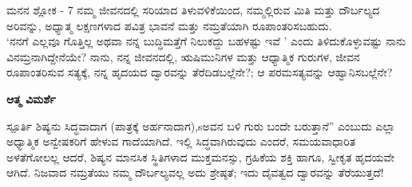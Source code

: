 \begin{mananam}{\mananamfont ಮನನ ಶ್ಲೋಕ - \textenglish{7}}
\footnotesize \mananamtext ನಮ್ಮ ಜೀವನದಲ್ಲಿ ಸರಿಯಾದ ತಿಳುವಳಿಕೆಯಿಂದ, ನಮ್ಮಲ್ಲಿರುವ ಮಿತಿ ಮತ್ತು  ದೌರ್ಬಲ್ಯದ  ಅರಿವನ್ನು, ಅಧ್ಯಾತ್ಮ ಲಕ್ಷಣಗಳಾದ ಪವಿತ್ರ ಭಾವನೆ ಮತ್ತು ನಮ್ರತೆಯಾಗಿ ರೂಪಾಂತರಿಸಬಹುದು. \\
‘ನನಗೆ ಎಲ್ಲವೂ ಗೊತ್ತಿಲ್ಲ ಅಥವಾ ನನ್ನ ಬುದ್ಧಿಮತ್ತೆಗೆ ನಿಲುಕದ್ದು ಬಹಳಷ್ಟು ಇವೆ ’ ಎಂದು ತಿಳಿದುಕೊಳ್ಳುವಷ್ಟು ನಾನು ವಿನಮ್ರನಾಗಿದ್ದೇನೆಯೇ? ನಾನು, ನನ್ನ ಜೀವನದಲ್ಲಿ, ಋಷಿಮುನಿಗಳ ಮತ್ತು ಆಧ್ಯಾತ್ಮಿಕ ಗುರುಗಳ, ಜೀವನ  ರೂಪಾಂತರಿಸುವ ಸತ್ಯಕ್ಕೆ, ನನ್ನ ಹೃದಯದ ದ್ವಾರವನ್ನು ತೆರೆದಿಡಬಲ್ಲೆನೇ?; ಆ ಪರಮಸತ್ಯವನ್ನು ಆಹ್ವಾನಿಸಬಲ್ಲೆನೇ?
\end{mananam}
\WritingHand\enspace\textbf{ಆತ್ಮ ವಿಮರ್ಶೆ}
\begin{inspiration}{\mananamfont ಸ್ಪೂರ್ತಿ}
\footnotesize \mananamtext ಶಿಷ್ಯನು ಸಿದ್ಧವಾದಾಗ (ಪಾತ್ರಕ್ಕೆ ಅರ್ಹನಾದಾಗ),sಅವನ ಬಳಿ ಗುರು ಬಂದೇ ಬರುತ್ತಾನೆ” ಎಂಬುದು ಎಲ್ಲಾ ಅಧ್ಯಾತ್ಮಿಕ ಅನ್ವೇಷಕರಿಗೆ ಹೇಳುವ ಗಾದೆಯಾಗಿದೆ. ಇಲ್ಲಿ ಸಿದ್ಧವಾಗಿರುವುದು ಎಂದರೆ, ಸಮಯವಾಧಾರಿತ ಅಳತೆಗೋಲಲ್ಲ ಆದರೆ, ಶಿಷ್ಯನ ಮಾನಸಿಕ ಸ್ಥಿತಿಗಳಾದ ಮುಕ್ತಮನಸ್ಸು, ಗ್ರಹಿಕೆಯ ಶಕ್ತಿ ಹಾಗೂ, ಸ್ವೀಕೃತ ಹೃದಯವೇ ಆಗಿದೆ. ನಿಜವಾದ ನಮ್ರತೆಯು ನಮ್ಮ ದೌರ್ಬಲ್ಯವಲ್ಲ ಅದು ಶ್ರೇಷ್ಠತೆ; ಇದು ದೈವತ್ವದ ದ್ವಾರವನ್ನು ತೆರೆಯುತ್ತದೆ!
\end{inspiration}
\newpage

